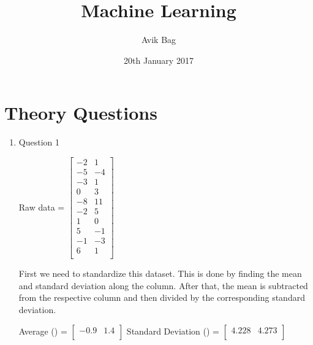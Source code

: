 \documentclass{article}
\title{Machine Learning}
\author{Avik Bag}
\date{20th January 2017}
\begin{document}
\maketitle

\section{Theory Questions}
\begin{enumerate}
  
  \item Question 1
    \begin{center}
      Raw data = 
      $
      \begin{bmatrix}
        -2 & 1 \\
        -5 & -4 \\
        -3 & 1 \\
        0  & 3 \\
        -8 & 11 \\
        -2 & 5 \\
        1  & 0 \\
        5  & -1 \\
        -1 & -3 \\
        6  & 1 \\
      \end{bmatrix}
      $
    \end{center}

    First we need to standardize this dataset. This is done by finding the mean and standard deviation along the column. After that, the mean is subtracted from the respective column and then divided by the corresponding standard deviation. 

    \begin{center}
      Average (\mu) = 
      $
      \begin{bmatrix}
        -0.9 & 1.4 \\
      \end{bmatrix}
      $
      Standard Deviation (\sigma) = 
      $
      \begin{bmatrix}
        4.228 & 4.273 \\
      \end{bmatrix}
      $
    \end{center}
  

\end{enumerate}
\end{document}
